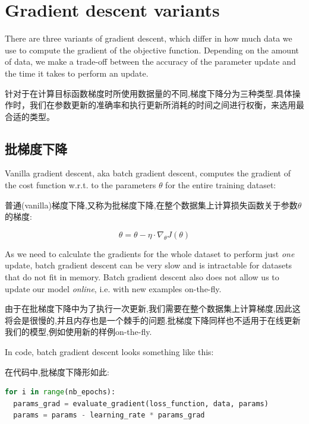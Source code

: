 \documentclass{article}
\begin{document}
\section{Gradient descent variants} \label{sec:gradient_descent_variants}

There are three variants of gradient descent, which differ in how much data we use to compute the gradient of the objective function. Depending on the amount of data, we make a trade-off between the accuracy of the parameter update and the time it takes to perform an update.

针对于在计算目标函数梯度时所使用数据量的不同,梯度下降分为三种类型.具体操作时，我们在参数更新的准确率和执行更新所消耗的时间之间进行权衡，来选用最合适的类型。

\subsection{批梯度下降}

Vanilla gradient descent, aka batch gradient descent, computes the gradient of the cost function w.r.t. to the parameters $\theta$ for the entire training dataset:

普通(vanilla)梯度下降,又称为批梯度下降,在整个数据集上计算损失函数关于参数$\theta$的梯度:

\begin{equation}
\theta = \theta - \eta \cdot \nabla_\theta J( \theta)
\end{equation}

As we need to calculate the gradients for the whole dataset to perform just \emph{one} update, batch gradient descent can be very slow and is intractable for datasets that do not fit in memory. Batch gradient descent also does not allow us to update our model \emph{online}, i.e. with new examples on-the-fly.

由于在批梯度下降中为了执行一次更新,我们需要在整个数据集上计算梯度,因此这将会是很慢的,并且内存也是一个棘手的问题.批梯度下降同样也不适用于在线更新我们的模型,例如使用新的样例on-the-fly.

In code, batch gradient descent looks something like this:

在代码中,批梯度下降形如此:

\begin{lstlisting}[language=python]
for i in range(nb_epochs):
  params_grad = evaluate_gradient(loss_function, data, params)
  params = params - learning_rate * params_grad
\end{lstlisting}
\end{document}

